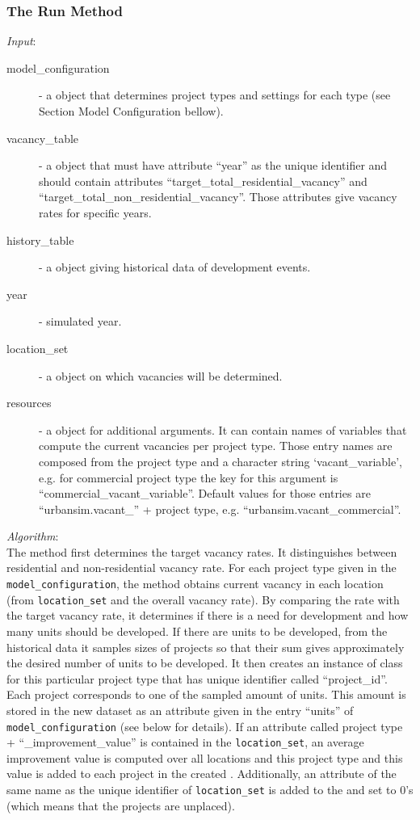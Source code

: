 \subsubsection{The Run Method}
%
{\it Input}:
\begin{description}
\item[model_configuration] - a  object that determines
  project types and settings for each type (see
  Section Model Configuration bellow).
\item[vacancy_table] - a  object that must have attribute
  ``year'' as the unique identifier and should contain attributes
  ``target_total_residential_vacancy'' and
  ``target_total_non_residential_vacancy''. Those attributes give vacancy
  rates for specific years.
\item[history_table] - a  object giving historical data of
  development events.
\item[year] - simulated year.
\item[location_set] - a  object on which vacancies will be
  determined.
\item[resources] - a  object for additional arguments. It can
  contain names of variables that compute the current vacancies per project
  type. Those entry names are composed from the project type and a character
  string `vacant_variable', e.g. for commercial project type the key for this
  argument is ``commercial_vacant_variable''.  Default values for those
  entries are ``urbansim.vacant_'' + project type, e.g.
  ``urbansim.vacant_commercial''.
\end{description}



{\it Algorithm}:~\\[1mm]
The method first determines the target vacancy rates. It distinguishes between
residential and non-residential vacancy rate.  For each project type given in
the \verb|model_configuration|, the method obtains current vacancy in each
location (from \verb|location_set| and the overall vacancy rate). By comparing
the rate with the target vacancy rate, it determines if there is a need for
development and how many units should be developed. If there are units to be
developed, from the historical data it samples sizes of projects so that their
sum gives approximately the desired number of units to be developed. It then
creates an instance of class  for this particular
project type that has unique identifier called ``project_id''. Each project
corresponds to one of the sampled amount of units. This amount is stored in
the new dataset as an attribute given in the entry ``units'' of
\verb|model_configuration| (see below for details). If an attribute called
project type + ``_improvement_value'' is contained in the \verb|location_set|,
an average improvement value is computed over all locations and this project
type and this value is added to each project in the created
.  Additionally, an attribute of the same name as
the unique identifier of \verb|location_set| is added to the
 and set to 0's (which means that the projects
are unplaced).


